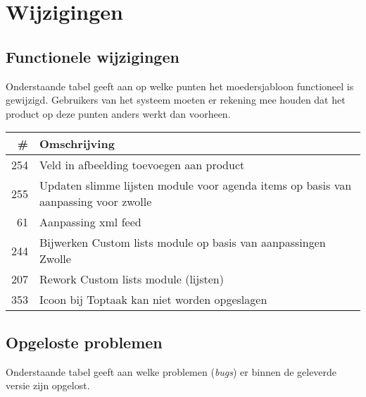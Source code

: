 \documentclass[12pt]{article}
\begin{document}
\section{Wijzigingen}
\subsection{Functionele wijzigingen}
Onderstaande tabel geeft aan op welke punten het moedersjabloon functioneel is gewijzigd. Gebruikers van het systeem moeten er rekening mee houden dat het product op deze punten anders werkt dan voorheen.

\begin{tabular}{| r | p{15cm} |}
	\hline \# & Omschrijving \\ \hline \hline
	254 & Veld in afbeelding toevoegen aan product \\ \hline
	255 & Updaten slimme lijsten module voor agenda items
		op basis van aanpassing voor zwolle \\ \hline
	61 & Aanpassing xml feed \\ \hline
	244 & Bijwerken Custom lists module op basis van
		aanpassingen Zwolle \\ \hline
	207 & Rework Custom lists module (lijsten) \\ \hline
	353 & Icoon bij Toptaak kan niet worden opgeslagen \\ \hline
\end{tabular}

\subsection{Opgeloste problemen}
Onderstaande tabel geeft aan welke problemen (\emph{bugs}) er binnen de geleverde versie zijn opgelost.
\end{document}
